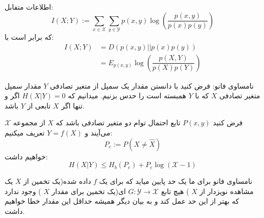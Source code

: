 \begin{definition}
اطلاعات متفابل:
$$I(X; Y) := \sum_{x \in \mathcal{X}} \sum_{y \in \mathcal{Y}} p(x, y) \log(\dfrac{p(x, y)}{p(x)p(y)})$$
که برابر است با:
\begin{align*}
    I(X;Y) &= D(p(x, y) || p(x)p(y))
    \\
    &= E_{p(x, y)} \log(\dfrac{p(X, Y)}{p(X)p(Y)})
\end{align*}
\end{definition}
نامساوی فانو: فرض کنید با دانستن مقدار یک سمپل از متغیر تصادفی
$Y$
مقدار سمپل متغیر تصادفی
$X$
که با
$Y$
همبسته است را حدس بزنیم. میدانیم که
$H(X|Y) = 0$
اگر و تنها اگر
$X$
تابعی از
$Y$
باشد. 
\begin{theorem}[
	فانو
	]
فرض کنید
$P(x, y)$
تابع احتمال توام دو متغیر تصادفی باشد که
$X$
از مجموعه
$\mathcal{X}$
می‌آیند و
$Y = f(X)$
تعریف میکنیم:
$$P_e := P(X \neq \hat{X})$$
خواهیم داشت:
$$H(X|Y) \leq H_b(P_e) + P_e \log(\mathcal{X} - 1)$$
\end{theorem}
\begin{remark}
نامساوی فانو برای ما یک حد پایین میاید که برای یک
$f$
داده شده(یک تخمین از
$X$
 یک مشاهده نویزدار از
$X$
) هیچ تابع
$G:\mathcal{Y} \rightarrow \mathcal{X}$
ای(یک تخمین برای مقدار
$X$
) وجود ندارد که بهتر از این حد عمل کند و به بیان دیگر همیشه حداقل این مقدار خطا خواهیم داشت.
\end{remark}
